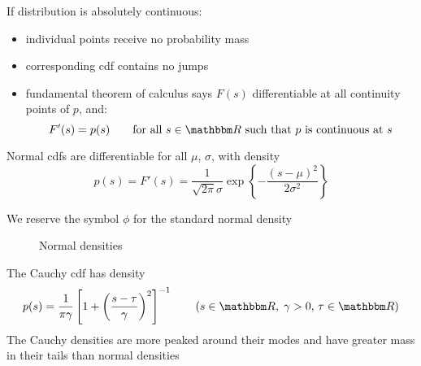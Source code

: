 \begin{frame}

    \vspace{2em}
    If distribution is absolutely continuous:
    
    \begin{itemize}
        \item individual points
    receive no probability mass 
        \item corresponding {\sc cdf} contains no jumps
        \item fundamental theorem of calculus says $F(s)$
        differentiable at all continuity points of $p$, and:
        \begin{equation*}
            F'(s) = p(s)
            \qquad \text{for all } s \in \RR \text{ such that $p$  is continuous at $s$}
        \end{equation*}
    \end{itemize}
    
\end{frame}

\begin{frame}

    \vspace{2em}
    \Eg
    Normal {\sc cdf}s  are differentiable for all
    $\mu$, $\sigma$, with density
    \begin{equation*}
        p(s) = F'(s) = 
        \frac{1}{\sqrt{2 \pi} \sigma}
           \exp \left\{ - 
               \frac{(s - \mu)^2}{2\sigma^2} \right\} 
    \end{equation*}
    
    \vspace{.7em}
    We reserve the symbol $\phi$ for the
    standard normal density
    
\end{frame}

\begin{frame}

    \begin{figure}
   \begin{center}
    \caption{\label{f:normal_densities} Normal densities}
   \end{center}
    \end{figure}
    
\end{frame}

\begin{frame}

    \vspace{2em}
    \Eg
    The Cauchy {\sc cdf} has density
    \begin{equation*}
        p(s) = 
        \frac{1}{\pi \gamma}
            \left[
                1 + \left( \frac{s - \tau}{\gamma} \right)^2
            \right]^{-1}
            \qquad (s \in \RR, \; \gamma > 0, \, \tau \in \RR)
    \end{equation*}
    The Cauchy densities are more peaked around their modes and have greater
    mass in their tails than normal densities
    
\end{frame}

